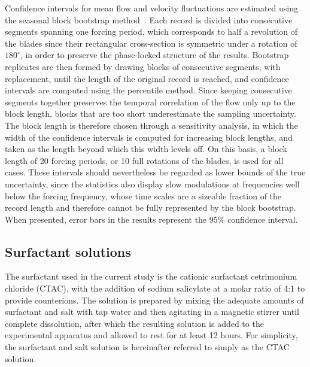 \documentclass[aps,prfluids,groupedaddress,showkeys,11pt,tightenlines]{revtex4-2}
\begin{document}
Confidence intervals for mean flow and velocity fluctuations are estimated using the seasonal block bootstrap method~\cite{Politis2001SBB}. Each record is divided into consecutive segments spanning one forcing period, which corresponds to half a revolution of the blades since their rectangular cross-section is symmetric under a rotation of $180^\circ$, in order to preserve the phase-locked structure of the results. Bootstrap replicates are then formed by drawing blocks of consecutive segments, with replacement, until the length of the original record is reached, and confidence intervals are computed using the percentile method. Since keeping consecutive segments together preserves the temporal correlation of the flow only up to the block length, blocks that are too short underestimate the sampling uncertainty. The block length is therefore chosen through a sensitivity analysis, in which the width of the confidence intervals is computed for increasing block lengths, and taken as the length beyond which this width levels off. On this basis, a block length of 20 forcing periods, or 10 full rotations of the blades, is used for all cases. These intervals should nevertheless be regarded as lower bounds of the true uncertainty, since the statistics also display slow modulations at frequencies well below the forcing frequency, whose time scales are a sizeable fraction of the record length and therefore cannot be fully represented by the block bootstrap. When presented, error bars in the results represent the 95\% confidence interval.

\subsection{Surfactant solutions\label{sec:Surfsol}}

The surfactant used in the current study is the cationic surfactant cetrimonium chloride (CTAC), with the addition of sodium salicylate at a molar ratio of 4:1 to provide counterions. The solution is prepared by mixing the adequate amounts of surfactant and salt with tap water and then agitating in a magnetic stirrer until complete dissolution, after which the resulting solution is added to the experimental apparatus and allowed to rest for at least 12 hours. For simplicity, the surfactant and salt solution is hereinafter referred to simply as the CTAC solution.
\end{document}
